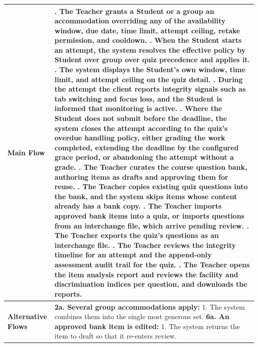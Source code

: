 \begin{longtable}{|>{\raggedright\arraybackslash}p{}|>{\raggedright\arraybackslash}p{}|}
\textbf{Main Flow} &
1. The Teacher grants a Student or a group an accommodation overriding any of the availability window, due date, time limit, attempt ceiling, retake permission, and cooldown. \newline
2. When the Student starts an attempt, the system resolves the effective policy by Student over group over quiz precedence and applies it. \newline
3. The system displays the Student's own window, time limit, and attempt ceiling on the quiz detail. \newline
4. During the attempt the client reports integrity signals such as tab switching and focus loss, and the Student is informed that monitoring is active. \newline
5. Where the Student does not submit before the deadline, the system closes the attempt according to the quiz's overdue handling policy, either grading the work completed, extending the deadline by the configured grace period, or abandoning the attempt without a grade. \newline
6. The Teacher curates the course question bank, authoring items as drafts and approving them for reuse. \newline
7. The Teacher copies existing quiz questions into the bank, and the system skips items whose content already has a bank copy. \newline
8. The Teacher imports approved bank items into a quiz, or imports questions from an interchange file, which arrive pending review. \newline
9. The Teacher exports the quiz's questions as an interchange file. \newline
10. The Teacher reviews the integrity timeline for an attempt and the append-only assessment audit trail for the quiz. \newline
11. The Teacher opens the item analysis report and reviews the facility and discrimination indices per question, and downloads the reports. \\ \hline
\textbf{Alternative Flows} &
\textbf{2a. Several group accommodations apply:} \newline
\hspace*{1em}1. The system combines them into the single most generous set. \newline
\textbf{6a. An approved bank item is edited:} \newline
\hspace*{1em}1. The system returns the item to draft so that it re-enters review. \newline

\end{longtable}

